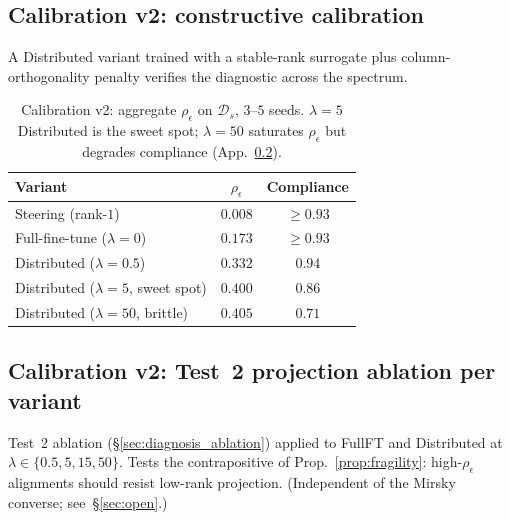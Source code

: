 \documentclass[10pt]{article}
\theoremstyle{definition}
\theoremstyle{remark}
\begin{document}
\subsection{Calibration v2: constructive calibration}
\label{app:calibration_v2}

A Distributed variant trained with a stable-rank
surrogate plus column-orthogonality penalty verifies
the diagnostic across the spectrum.

\begin{table}[h]\centering
\caption{Calibration v2: aggregate $\rho_{\epsilon}$ on
$\mathcal{D}_s$, $3$--$5$ seeds.
$\lambda{=}5$ Distributed is the sweet spot;
$\lambda{=}50$ saturates $\rho_{\epsilon}$ but degrades
compliance (App.~\ref{app:calibration_v2_ablation}).}
\label{tab:calibration_v2}
\begin{tabular}{@{}lcc@{}}
\toprule
Variant & $\rho_{\epsilon}$ & Compliance \\
\midrule
Steering (rank-$1$)            & $0.008$ & $\geq 0.93$ \\
Full-fine-tune ($\lambda{=}0$) & $0.173$ & $\geq 0.93$ \\
Distributed ($\lambda{=}0.5$)  & $0.332$ & $0.94$ \\
Distributed ($\lambda{=}5$, sweet spot) & $\mathbf{0.400}$ & $\mathbf{0.86}$ \\
Distributed ($\lambda{=}50$, brittle)   & $0.405$ & $0.71$ \\
\bottomrule
\end{tabular}
\end{table}

\subsection{Calibration v2: Test~2 projection ablation per variant}
\label{app:calibration_v2_ablation}

Test~2 ablation (\S\ref{sec:diagnosis_ablation}) applied
to FullFT and Distributed at $\lambda \in \{0.5, 5,
15, 50\}$.  Tests the contrapositive of
Prop.~\ref{prop:fragility}: high-$\rho_{\epsilon}$
alignments should resist low-rank projection.
(Independent of the Mirsky converse;
see~\S\ref{sec:open}.)
\end{document}
